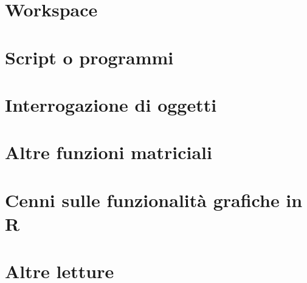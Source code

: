 \documentclass[a4paper,12pt,oneside]{book}
\begin{document}
\hypertarget{workspace}{%
\section*{Workspace}\label{workspace}}

\hypertarget{script-o-programmi}{%
\section*{Script o programmi}\label{script-o-programmi}}

\hypertarget{interrogazione-di-oggetti}{%
\section*{Interrogazione di oggetti}\label{interrogazione-di-oggetti}}

\hypertarget{altre-funzioni-matriciali}{%
\section*{Altre funzioni matriciali}\label{altre-funzioni-matriciali}}

\hypertarget{cenni-sulle-funzionalituxe0-grafiche-in-r}{%
\section*{Cenni sulle funzionalità grafiche in R}\label{cenni-sulle-funzionalituxe0-grafiche-in-r}}

\hypertarget{altre-letture-12}{%
\section*{Altre letture}\label{altre-letture-12}}
\end{document}

